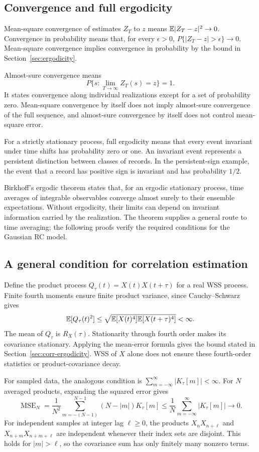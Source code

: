\subsection{Convergence and full ergodicity}
\label{app:convergence}
Mean-square convergence of estimates $Z_T$ to $z$ means $\mathbb E|Z_T-z|^2\to0$. Convergence in probability means that, for every $\epsilon>0$, $P\{|Z_T-z|>\epsilon\}\to0$. Mean-square convergence implies convergence in probability by the bound in Section~\ref{sec:ergodicity}.

Almost-sure convergence means
\[
P\{s:\lim_{T\to\infty}Z_T(s)=z\}=1.
\]
It states convergence along individual realizations except for a set of probability zero. Mean-square convergence by itself does not imply almost-sure convergence of the full sequence, and almost-sure convergence by itself does not control mean-square error.

For a strictly stationary process, full ergodicity means that every event invariant under time shifts has probability zero or one. An invariant event represents a persistent distinction between classes of records. In the persistent-sign example, the event that a record has positive sign is invariant and has probability $1/2$.

Birkhoff's ergodic theorem states that, for an ergodic stationary process, time averages of integrable observables converge almost surely to their ensemble expectations. Without ergodicity, their limits can depend on invariant information carried by the realization. The theorem supplies a general route to time averaging; the following proofs verify the required conditions for the Gaussian RC model.

\subsection{A general condition for correlation estimation}
\label{app:correlation-proof}
Define the product process $Q_\tau(t)=X(t)X(t+\tau)$ for a real WSS process. Finite fourth moments ensure finite product variance, since Cauchy--Schwarz gives
\[
\mathbb E[Q_\tau(t)^2]\leq\sqrt{\mathbb E[X(t)^4]\mathbb E[X(t+\tau)^4]}<\infty.
\]
The mean of $Q_\tau$ is $R_X(\tau)$. Stationarity through fourth order makes its covariance stationary. Applying the mean-error formula gives the bound stated in Section~\ref{sec:corr-ergodicity}. WSS of $X$ alone does not ensure these fourth-order statistics or product-covariance decay.

For sampled data, the analogous condition is
$\sum_{m=-\infty}^{\infty}|K_\tau[m]|<\infty$. For $N$ averaged products, expanding the squared error gives
\[
\operatorname{MSE}_N=\frac1{N^2}
\sum_{m=-(N-1)}^{N-1}(N-|m|)K_\tau[m]
\leq\frac1N\sum_{m=-\infty}^{\infty}|K_\tau[m]|\longrightarrow0.
\]
For independent samples at integer lag $\ell\geq0$, the products $X_nX_{n+\ell}$ and $X_{n+m}X_{n+m+\ell}$ are independent whenever their index sets are disjoint. This holds for $|m|>\ell$, so the covariance sum has only finitely many nonzero terms.

